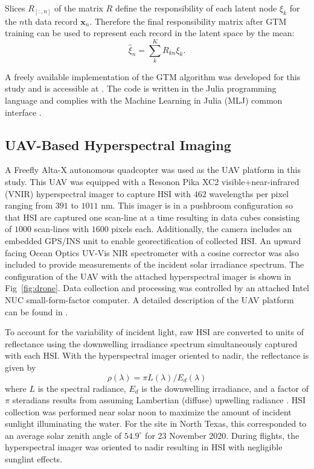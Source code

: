 \documentclass[remotesensing,article,submit,pdftex,moreauthors]{Definitions/mdpi}
\begin{document}
Slices $R_{[:,n]}$ of the matrix $R$ define the responsibility of each latent node $\xi_k$ for the $n$th data record $\mathbf{x}_n$. Therefore the final responsibility matrix after GTM training can be used to represent each record in the latent space by the mean:
\begin{equation}\label{eq:mean-resp}
    \hat{\xi}_n = \sum_{k}^K R_{kn}\xi_k.
\end{equation}

A freely available implementation of the GTM algorithm was developed for this study and is accessible at \cite{gtm-code}. The code is written in the Julia programming language and complies with the Machine Learning in Julia (MLJ) common interface \cite{bezanson2012julia,blaom2020mlj}.

\subsection{UAV-Based Hyperspectral Imaging}

A Freefly Alta-X autonomous quadcopter was used as the UAV platform in this study. This UAV was equipped with a Resonon Pika XC2 visible+near-infrared (VNIR) hyperspectral imager to capture HSI with $462$ wavelengths per pixel ranging from $391$ to $1011$ nm. This imager is in a pushbroom configuration so that HSI are captured one scan-line at a time resulting in data cubes consisting of $1000$ scan-lines with $1600$ pixels each. Additionally, the camera includes an embedded GPS/INS unit to enable georectification of collected HSI. An upward facing Ocean Optics UV-Vis NIR spectrometer with a cosine corrector was also included to provide measurements of the incident solar irradiance spectrum. The configuration of the UAV with the attached hyperspectral imager is shown in Fig~\ref{fig:drone}. Data collection and processing was controlled by an attached Intel NUC small-form-factor computer. A detailed description of the UAV platform can be found in \cite{robot-team-1}.

To account for the variability of incident light, raw HSI are converted to units of reflectance using the downwelling irradiance spectrum simultaneously captured with each HSI. With the hyperspectral imager oriented to nadir, the reflectance is given by
\begin{equation}\label{eq:reflectance}
    \rho(\lambda) = \pi L(\lambda)/E_d(\lambda)
\end{equation}
where $L$ is the spectral radiance, $E_d$ is the downwelling irradiance, and a factor of $\pi$ steradians results from assuming Lambertian (diffuse) upwelling radiance \cite{ruddick2019review}. HSI collection was performed near solar noon to maximize the amount of incident sunlight illuminating the water. For the site in North Texas, this corresponded to an average solar zenith angle of $54.9^\circ$ for 23 November 2020. During flights, the hyperspectral imager was oriented to nadir resulting in HSI with negligible sunglint effects.
\end{document}
